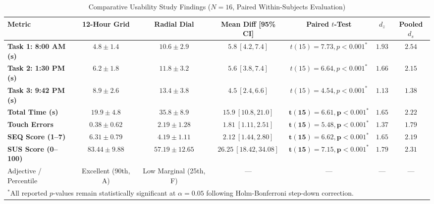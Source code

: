 \documentclass[11pt,a4paper]{article}
\begin{document}
\begin{table}[t]
\centering
\small
\caption{Comparative Usability Study Findings ($N=16$, Paired Within-Subjects Evaluation)}
\label{tab:usability_results}
\begin{tabularx}{\textwidth}{lcccccc}
\toprule
\textbf{Metric} & \textbf{12-Hour Grid} & \textbf{Radial Dial} & \textbf{Mean Diff [95\% CI]} & \textbf{Paired $t$-Test} & \textbf{$d_z$} & \textbf{Pooled $d_s$} \\
\midrule
\textbf{Task 1: 8:00 AM (s)} & $4.8 \pm 1.4$ & $10.6 \pm 2.9$ & $5.8\ [4.2, 7.4]$ & $t(15) = 7.73, p < 0.001^*$ & $1.93$ & $2.54$ \\
\textbf{Task 2: 1:30 PM (s)} & $6.2 \pm 1.8$ & $11.8 \pm 3.2$ & $5.6\ [3.8, 7.4]$ & $t(15) = 6.64, p < 0.001^*$ & $1.66$ & $2.15$ \\
\textbf{Task 3: 9:42 PM (s)} & $8.9 \pm 2.6$ & $13.4 \pm 3.8$ & $4.5\ [2.4, 6.6]$ & $t(15) = 4.54, p < 0.001^*$ & $1.13$ & $1.38$ \\
\midrule
\textbf{Total Time (s)} & $\mathbf{19.9 \pm 4.8}$ & $\mathbf{35.8 \pm 8.9}$ & $\mathbf{15.9\ [10.8, 21.0]}$ & $\mathbf{t(15) = 6.61, p < 0.001^*}$ & $\mathbf{1.65}$ & $\mathbf{2.22}$ \\
\textbf{Touch Errors} & $\mathbf{0.38 \pm 0.62}$ & $\mathbf{2.19 \pm 1.28}$ & $\mathbf{1.81\ [1.11, 2.51]}$ & $\mathbf{t(15) = 5.48, p < 0.001^*}$ & $\mathbf{1.37}$ & $\mathbf{1.79}$ \\
\textbf{SEQ Score (1--7)} & $\mathbf{6.31 \pm 0.79}$ & $\mathbf{4.19 \pm 1.11}$ & $\mathbf{2.12\ [1.44, 2.80]}$ & $\mathbf{t(15) = 6.62, p < 0.001^*}$ & $\mathbf{1.65}$ & $\mathbf{2.19}$ \\
\midrule
\textbf{SUS Score (0--100)} & $\mathbf{83.44 \pm 9.88}$ & $\mathbf{57.19 \pm 12.65}$ & $\mathbf{26.25\ [18.42, 34.08]}$ & $\mathbf{t(15) = 7.15, p < 0.001^*}$ & $\mathbf{1.79}$ & $\mathbf{2.31}$ \\
Adjective / Percentile & Excellent (90th, A) & Low Marginal (25th, F) & --- & --- & --- & --- \\
\bottomrule
\multicolumn{7}{l}{\footnotesize $^*$All reported $p$-values remain statistically significant at $\alpha = 0.05$ following Holm-Bonferroni step-down correction.}
\end{tabularx}
\end{table}
\end{document}
